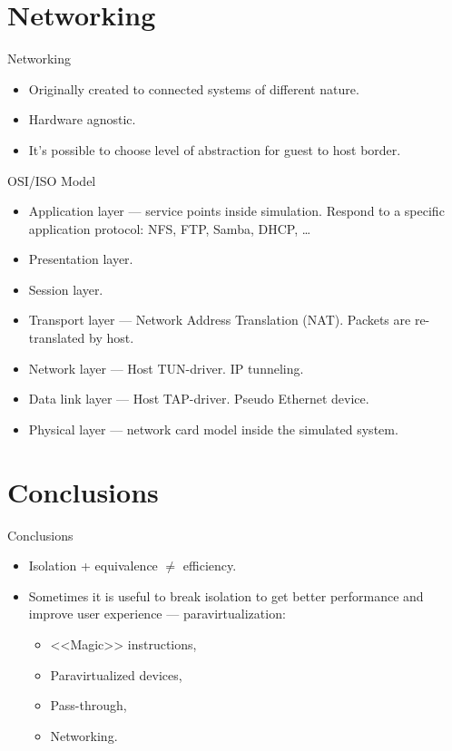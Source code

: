 \section{Networking}

\begin{frame}{Networking}
  \begin{itemize}
    \item Originally created to connected systems of different nature.
    \item Hardware agnostic.
    \item It's possible to choose level of abstraction for guest to host
      border.
  \end{itemize}
\end{frame}

\begin{frame}{OSI/ISO Model}
  \begin{itemize}
    \item Application layer --- service points inside simulation. Respond to a
      specific application protocol: NFS, FTP, Samba, DHCP, \dots
    \item Presentation layer.
    \item Session layer.
    \item Transport layer --- Network Address Translation (NAT). Packets are
      re-translated by host.
    \item Network layer --- Host TUN-driver. IP tunneling.
    \item Data link layer --- Host TAP-driver. Pseudo Ethernet device.
    \item Physical layer --- network card model inside the simulated system.
  \end{itemize}
\end{frame}

\section*{Conclusions}

\begin{frame}{Conclusions}
  \begin{itemize}
    \item Isolation + equivalence $\neq$ efficiency.
    \item Sometimes it is useful to break isolation to get better performance
      and improve user experience --- paravirtualization:
    \begin{itemize}
      \item{<<Magic>> instructions,}
      \item Paravirtualized devices,
      \item Pass-through,
      \item Networking.
    \end{itemize}
  \end{itemize}
\end{frame}

